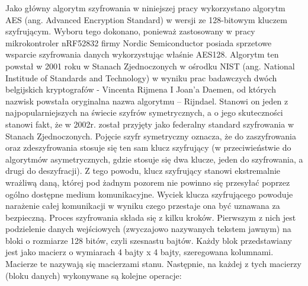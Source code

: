 Jako główny algorytm szyfrowania w niniejszej pracy wykorzystano algorytm AES (ang. Advanced Encryption Standard) w wersji ze 128-bitowym kluczem szyfrującym.  Wyboru tego dokonano, ponieważ zastosowany w pracy mikrokontroler nRF52832 firmy Nordic Semiconductor posiada sprzetowe wsparcie szyfrowania danych wykorzystując właśnie AES128. Algorytm ten powstał w 2001 roku w Stanach Zjednoczonych w ośrodku NIST (ang. National Institude of Standards and Technology) w wyniku prac badawczych dwóch belgijskich kryptografów - Vincenta Rijmena I Joan’a Daemen, od których nazwisk powstała oryginalna nazwa algorytmu – Rijndael. Stanowi on jeden z najpopularniejszych na świecie szyfrów symetrycznych, a o jego skuteczności stanowi fakt, że w 2002r. został przyjęty jako federalny standard szyfrowania w Stanach Zjednoczonych. Pojęcie szyfr symetryczny oznacza, że do zaszyfrowania oraz zdeszyfrowania stosuje się ten sam klucz szyfrujący (w przeciwieństwie do algorytmów asymetrycznych, gdzie stosuje się dwa klucze, jeden do szyfrowania, a drugi do deszyfracji). Z tego powodu, klucz szyfrujący stanowi ekstremalnie wrażliwą daną, której pod żadnym pozorem nie powinno się przesyłać poprzez ogólno dostępne medium komunikacyjne. Wyciek klucza szyfrującego powoduje narażenie całej komunikacji w wyniku czego przestaje ona być uznawana za bezpieczną.
Proces szyfrowania składa się z kilku kroków. Pierwszym z nich jest podzielenie danych wejściowych (zwyczajowo nazywanych tekstem jawnym) na bloki o rozmiarze 128 bitów, czyli szesnastu bajtów. Każdy blok przedstawiany jest jako macierz o wymiarach 4 bajty x 4 bajty, szeregowana kolumnami. Macierze te nazywają się macierzami stanu. Następnie, na każdej z tych macierzy (bloku danych) wykonywane są kolejne operacje:

